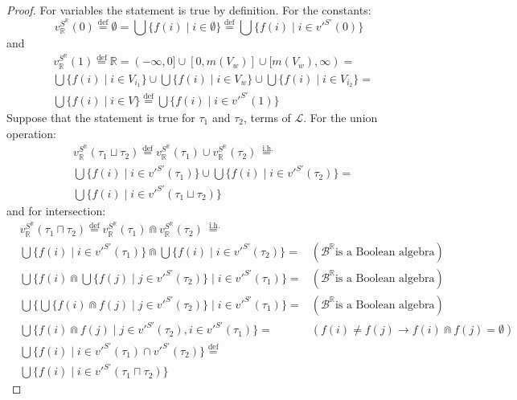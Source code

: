 \documentclass{article}
\newcommand{\R}{\mathbb{R}}
\newcommand{\B}{\mathcal{B}}
\newcommand{\bcap}{\Cap}
\newcommand{\lang}{\mathcal{L}}
\newcommand{\lcup}{\sqcup}
\newcommand{\lcap}{\sqcap}
\newcommand{\eqdef}{\stackrel{\text{def}}{=}}
\newcommand{\eqih}{\stackrel{\text{ i.h.}}{=}}
\begin{document}
\begin{proof}
    For variables the statement is true by definition. For the constants:
    \begin{equation*}
      v_\R^{S^\R}(0) \eqdef \emptyset = \bigcup\{ f(i) \mid i \in \emptyset\} \eqdef \bigcup\{ f(i) \mid i \in v'^{S'}(0)\}
    \end{equation*}
    and
    \begin{align*}
      & v_\R^{S^\R}(1) \eqdef \R = (-\infty, 0] \cup [0, m(V_w)] \cup [m(V_w), \infty) = \\
    & \bigcup\{ f(i) \mid i \in V_{i_1}\} \cup \bigcup\{ f(i) \mid i \in V_w\} \cup \bigcup\{ f(i) \mid i \in V_{i_2}\} = \\
    & \bigcup\{ f(i) \mid i \in V\} \eqdef \bigcup\{ f(i) \mid i \in v'^{S'}(1)\}
    \end{align*}
Suppose that the statement is true for $\tau_1$ and $\tau_2$, terms of $\lang$. For the union operation:
    \begin{align*}
      & v_\R^{S^\R}(\tau_1 \lcup \tau_2) \eqdef v_\R^{S^\R}(\tau_1) \cup v_\R^{S^\R}(\tau_2) \eqih \\
      & \bigcup\{ f(i) \mid i \in v'^{S'}(\tau_1)\} \cup \bigcup\{ f(i) \mid i \in v'^{S'}(\tau_2)\} = \\
      & \bigcup\{ f(i) \mid i \in v'^{S'}(\tau_1 \lcup \tau_2)\}
    \end{align*}
    and for intersection:
    \begin{align*}
      & v_\R^{S^\R}(\tau_1 \lcap \tau_2) \eqdef v_\R^{S^\R}(\tau_1) \bcap v_\R^{S^\R}(\tau_2) \eqih \\
      & \bigcup\{ f(i) \mid i \in v'^{S'}(\tau_1)\} \bcap \bigcup\{ f(i) \mid i \in v'^{S'}(\tau_2)\} = & (\B^\R \text{is a Boolean algebra}) \\
      & \bigcup\{ f(i) \bcap \bigcup\{ f(j) \mid j \in v'^{S'}(\tau_2)\} \mid i \in v'^{S'}(\tau_1)\} = & (\B^\R \text{is a Boolean algebra}) \\
      & \bigcup\{ \bigcup\{ f(i) \bcap f(j) \mid j \in v'^{S'}(\tau_2)\} \mid i \in v'^{S'}(\tau_1)\} = & (\B^\R \text{is a Boolean algebra}) \\
      & \bigcup\{ f(i) \bcap f(j) \mid j \in v'^{S'}(\tau_2), i \in v'^{S'}(\tau_1)\} = & (f(i) \neq f(j) \rightarrow f(i) \bcap f(j) = \emptyset) \\
      & \bigcup\{ f(i) \mid i \in v'^{S'}(\tau_1) \cap v'^{S'}(\tau_2)\} \eqdef \\
      & \bigcup\{ f(i) \mid i \in v'^{S'}(\tau_1 \lcap \tau_2)\}
    \end{align*}

\end{proof}
\end{document}
